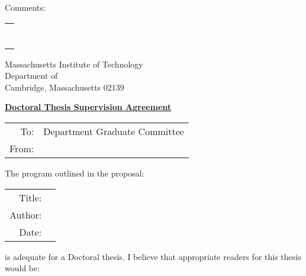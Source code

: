 \vspace{0in plus 1fill}

Comments: \\
\begin{tabular}{c}
  \hspace{6.25in} \\
  \mbox{} \\ \cline{1-1} \mbox{} \\
  \mbox{} \\ \cline{1-1} \mbox{} \\
  \mbox{} \\ \cline{1-1} \mbox{} \\
\end{tabular}

\newpage %

\begin{flushright}
	Massachusetts Institute of Technology
	\\ Department of \deptname
	\\ Cambridge, Massachusetts 02139
\end{flushright}

\underline{\bf Doctoral Thesis Supervision Agreement}

\vspace{.25in}
\begin{tabular}{rl}
	{\small \sc To:}   & Department Graduate Committee
	\\ {\small \sc From:} & \supervisortwo
\end{tabular}

\vspace{.25in}
The program outlined in the proposal:

\vspace{.25in}
\begin{tabular}{rl}
	{\small \sc Title:}  & \title
	\\ {\small \sc Author:} & \author
	\\ {\small \sc Date:}   & \submissiondate
\end{tabular}

\vspace{.25in}
is adequate for a Doctoral thesis.
I believe that appropriate readers for this thesis would be:

